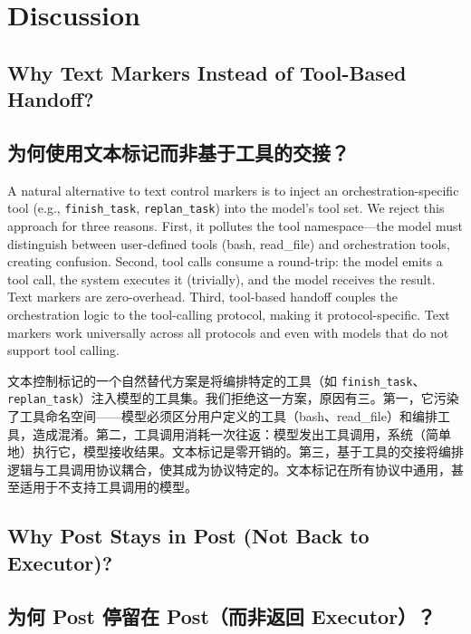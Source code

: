 \section{Discussion}
\label{sec:discussion}

\subsection{Why Text Markers Instead of Tool-Based Handoff?}
\begin{chinese}
\subsection{为何使用文本标记而非基于工具的交接？}
\end{chinese}

A natural alternative to text control markers is to inject an orchestration-specific tool (e.g., \texttt{finish\_task}, \texttt{replan\_task}) into the model's tool set. We reject this approach for three reasons. First, it pollutes the tool namespace---the model must distinguish between user-defined tools (bash, read\_file) and orchestration tools, creating confusion. Second, tool calls consume a round-trip: the model emits a tool call, the system executes it (trivially), and the model receives the result. Text markers are zero-overhead. Third, tool-based handoff couples the orchestration logic to the tool-calling protocol, making it protocol-specific. Text markers work universally across all protocols and even with models that do not support tool calling.
\begin{chinese}
文本控制标记的一个自然替代方案是将编排特定的工具（如 \texttt{finish\_task}、\texttt{replan\_task}）注入模型的工具集。我们拒绝这一方案，原因有三。第一，它污染了工具命名空间——模型必须区分用户定义的工具（bash、read\_file）和编排工具，造成混淆。第二，工具调用消耗一次往返：模型发出工具调用，系统（简单地）执行它，模型接收结果。文本标记是零开销的。第三，基于工具的交接将编排逻辑与工具调用协议耦合，使其成为协议特定的。文本标记在所有协议中通用，甚至适用于不支持工具调用的模型。
\end{chinese}

\subsection{Why Post Stays in Post (Not Back to Executor)?}
\begin{chinese}
\subsection{为何 Post 停留在 Post（而非返回 Executor）？}
\end{chinese}


